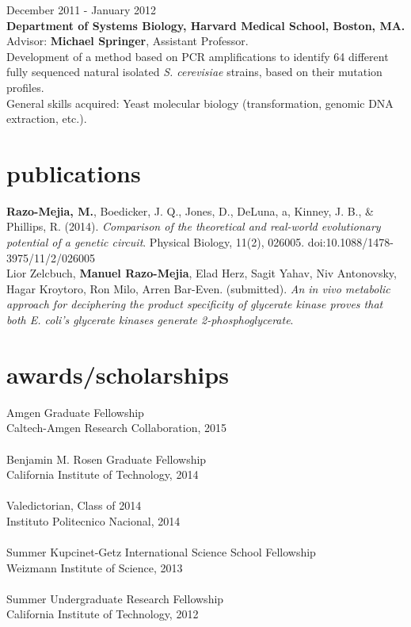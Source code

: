 \documentclass[]{friggeri-cv}
\begin{document}
{\small{}December 2011 - January 2012}\\
\textbf{Department of Systems Biology, Harvard Medical School, Boston, MA.}\\
Advisor: \textbf{Michael Springer}, Assistant Professor.\\
Development of a method based on PCR amplifications to identify 64 different fully sequenced natural isolated \textit{S. cerevisiae} strains, based on their mutation profiles.\\
{\small{}General skills acquired: Yeast molecular biology (transformation, genomic DNA extraction, etc.).}\\

\section{publications}
\textbf{Razo-Mejia, M.}, Boedicker, J. Q., Jones, D., DeLuna, a, Kinney, J. B., & Phillips, R. (2014). \textit{Comparison of the theoretical and real-world evolutionary potential of a genetic circuit}. Physical Biology, 11(2), 026005. doi:10.1088/1478-3975/11/2/026005\\

Lior Zelcbuch, \textbf{Manuel Razo-Mejia}, Elad Herz, Sagit Yahav, Niv Antonovsky, Hagar Kroytoro, Ron Milo, Arren Bar-Even. (submitted). \textit{An in vivo metabolic approach for deciphering the product specificity of glycerate kinase proves that both E. coli's glycerate kinases generate 2-phosphoglycerate}.


\section{awards/scholarships}
Amgen Graduate Fellowship\\
{Caltech-Amgen Research Collaboration, 2015}\\
\\
Benjamin M. Rosen Graduate Fellowship\\
{California Institute of Technology, 2014}\\
\\
Valedictorian, Class of 2014\\
{Instituto Politecnico Nacional, 2014}\\
\\
Summer Kupcinet-Getz International Science School Fellowship\\
{Weizmann Institute of Science, 2013}\\
\\
Summer Undergraduate Research Fellowship\\
{California Institute of Technology, 2012}\\
\end{document}
